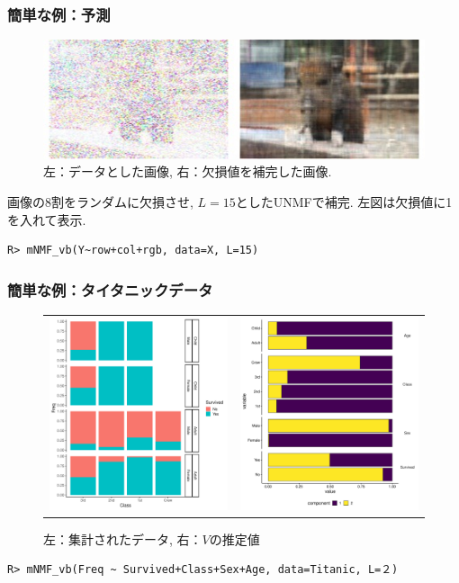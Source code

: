 \documentclass[dvipdfmx]{beamer}
\begin{document}
\begin{frame}[fragile]
\frametitle{簡単な例：予測}

\begin{figure}
\centering
\includegraphics[width=12cm]{img/uri_imp.jpeg}
\caption{左：データとした画像, 右：欠損値を補完した画像. }
\end{figure}
画像の8割をランダムに欠損させ, $L=15$としたUNMFで補完. 左図は欠損値に1を入れて表示. 
\begin{verbatim}
R> mNMF_vb(Y~row+col+rgb, data=X, L=15)
 \end{verbatim}
\end{frame}
\begin{frame}[fragile]
\frametitle{簡単な例：タイタニックデータ}

\begin{figure}
\centering
\begin{tabular}{cc}
\includegraphics[width=5.5cm]{img/Titanic.pdf} & 
\includegraphics[width=5.5cm]{img/Titanic_V.pdf} 
\end{tabular}
\caption{左：集計されたデータ, 右：$V$の推定値}
\end{figure}

\begin{verbatim}
R> mNMF_vb(Freq ~ Survived+Class+Sex+Age, data=Titanic, L=２)
\end{verbatim}
\end{frame}
\end{document}
